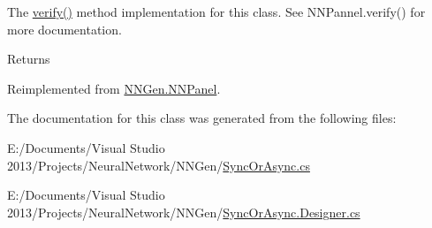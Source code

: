 The \hyperlink{class_n_n_gen_1_1_sync_or_async_a43e1723039a0485fe09f6f374eb48620}{verify()} method implementation for this class. See N\+N\+Pannel.\+verify() for more documentation. 

\begin{DoxyReturn}{Returns}

\end{DoxyReturn}


Reimplemented from \hyperlink{class_n_n_gen_1_1_n_n_panel_a36e3bcf90c9e561e8502eac6f884582a}{N\+N\+Gen.\+N\+N\+Panel}.



The documentation for this class was generated from the following files\+:\begin{DoxyCompactItemize}
\item 
E\+:/\+Documents/\+Visual Studio 2013/\+Projects/\+Neural\+Network/\+N\+N\+Gen/\hyperlink{_sync_or_async_8cs}{Sync\+Or\+Async.\+cs}\item 
E\+:/\+Documents/\+Visual Studio 2013/\+Projects/\+Neural\+Network/\+N\+N\+Gen/\hyperlink{_sync_or_async_8_designer_8cs}{Sync\+Or\+Async.\+Designer.\+cs}\end{DoxyCompactItemize}
